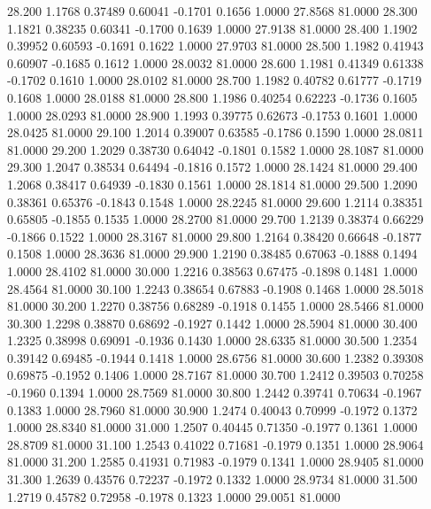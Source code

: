   28.200   1.1768   0.37489   0.60041  -0.1701   0.1656   1.0000  27.8568  81.0000
  28.300   1.1821   0.38235   0.60341  -0.1700   0.1639   1.0000  27.9138  81.0000
  28.400   1.1902   0.39952   0.60593  -0.1691   0.1622   1.0000  27.9703  81.0000
  28.500   1.1982   0.41943   0.60907  -0.1685   0.1612   1.0000  28.0032  81.0000
  28.600   1.1981   0.41349   0.61338  -0.1702   0.1610   1.0000  28.0102  81.0000
  28.700   1.1982   0.40782   0.61777  -0.1719   0.1608   1.0000  28.0188  81.0000
  28.800   1.1986   0.40254   0.62223  -0.1736   0.1605   1.0000  28.0293  81.0000
  28.900   1.1993   0.39775   0.62673  -0.1753   0.1601   1.0000  28.0425  81.0000
  29.100   1.2014   0.39007   0.63585  -0.1786   0.1590   1.0000  28.0811  81.0000
  29.200   1.2029   0.38730   0.64042  -0.1801   0.1582   1.0000  28.1087  81.0000
  29.300   1.2047   0.38534   0.64494  -0.1816   0.1572   1.0000  28.1424  81.0000
  29.400   1.2068   0.38417   0.64939  -0.1830   0.1561   1.0000  28.1814  81.0000
  29.500   1.2090   0.38361   0.65376  -0.1843   0.1548   1.0000  28.2245  81.0000
  29.600   1.2114   0.38351   0.65805  -0.1855   0.1535   1.0000  28.2700  81.0000
  29.700   1.2139   0.38374   0.66229  -0.1866   0.1522   1.0000  28.3167  81.0000
  29.800   1.2164   0.38420   0.66648  -0.1877   0.1508   1.0000  28.3636  81.0000
  29.900   1.2190   0.38485   0.67063  -0.1888   0.1494   1.0000  28.4102  81.0000
  30.000   1.2216   0.38563   0.67475  -0.1898   0.1481   1.0000  28.4564  81.0000
  30.100   1.2243   0.38654   0.67883  -0.1908   0.1468   1.0000  28.5018  81.0000
  30.200   1.2270   0.38756   0.68289  -0.1918   0.1455   1.0000  28.5466  81.0000
  30.300   1.2298   0.38870   0.68692  -0.1927   0.1442   1.0000  28.5904  81.0000
  30.400   1.2325   0.38998   0.69091  -0.1936   0.1430   1.0000  28.6335  81.0000
  30.500   1.2354   0.39142   0.69485  -0.1944   0.1418   1.0000  28.6756  81.0000
  30.600   1.2382   0.39308   0.69875  -0.1952   0.1406   1.0000  28.7167  81.0000
  30.700   1.2412   0.39503   0.70258  -0.1960   0.1394   1.0000  28.7569  81.0000
  30.800   1.2442   0.39741   0.70634  -0.1967   0.1383   1.0000  28.7960  81.0000
  30.900   1.2474   0.40043   0.70999  -0.1972   0.1372   1.0000  28.8340  81.0000
  31.000   1.2507   0.40445   0.71350  -0.1977   0.1361   1.0000  28.8709  81.0000
  31.100   1.2543   0.41022   0.71681  -0.1979   0.1351   1.0000  28.9064  81.0000
  31.200   1.2585   0.41931   0.71983  -0.1979   0.1341   1.0000  28.9405  81.0000
  31.300   1.2639   0.43576   0.72237  -0.1972   0.1332   1.0000  28.9734  81.0000
  31.500   1.2719   0.45782   0.72958  -0.1978   0.1323   1.0000  29.0051  81.0000
